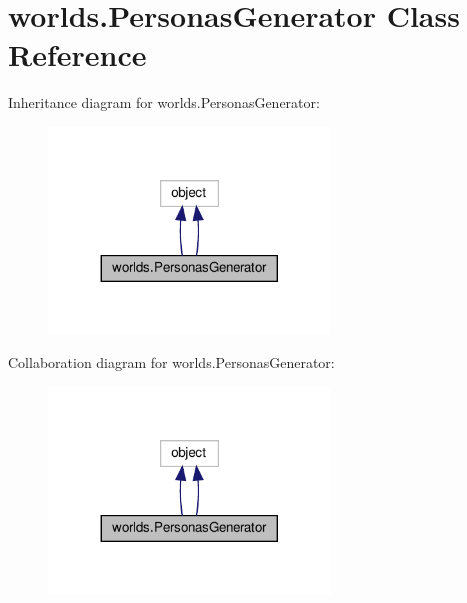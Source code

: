 \hypertarget{classworlds_1_1PersonasGenerator}{}\section{worlds.\+Personas\+Generator Class Reference}
\label{classworlds_1_1PersonasGenerator}


Inheritance diagram for worlds.\+Personas\+Generator\+:
\nopagebreak
\begin{figure}[H]
\begin{center}
\leavevmode
\includegraphics[width=212pt]{classworlds_1_1PersonasGenerator__inherit__graph}
\end{center}
\end{figure}


Collaboration diagram for worlds.\+Personas\+Generator\+:
\nopagebreak
\begin{figure}[H]
\begin{center}
\leavevmode
\includegraphics[width=212pt]{classworlds_1_1PersonasGenerator__coll__graph}
\end{center}
\end{figure}
